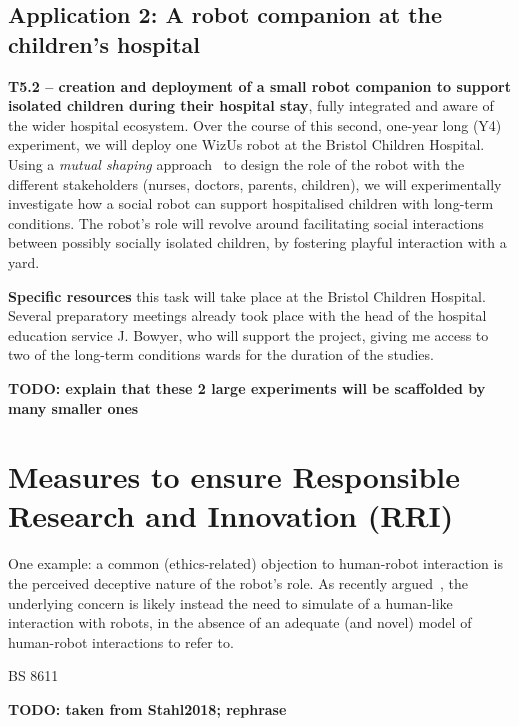 \documentclass[11pt,a4paper]{report}
\newcommand{\project}{WizUs\xspace}
\newcommand{\TODO}[1]{{\color{red}\textbf{TODO: #1}}}
\begin{document}
\subsection{Application 2: A robot companion at the children's hospital}
\textbf{T5.2 -- creation and deployment of a small robot companion to support
isolated children during their hospital stay}, fully integrated and aware of the
wider hospital ecosystem. Over the course of this second, one-year long (Y4)
experiment, we will deploy one \project robot at the Bristol Children Hospital.
Using a \emph{mutual shaping} approach~\cite{winkle2018social} to design the
role of the robot with the different stakeholders (nurses, doctors, parents,
children), we will experimentally investigate how a social robot can support
hospitalised children with long-term conditions. The robot's role will revolve
around facilitating social interactions between possibly socially isolated
children, by fostering playful interaction with a yard.

\textbf{Specific resources} this task will take place at the Bristol Children
Hospital. Several preparatory meetings already took place with the head of the
hospital education service J. Bowyer, who will support the project, giving me
access to two of the long-term conditions wards for the duration of the studies.



\TODO{explain that these 2 large experiments will be scaffolded by many smaller
ones}


\section{Measures to ensure Responsible Research and Innovation (RRI)}



One example: a common (ethics-related) objection to human-robot interaction is
the perceived deceptive nature of the robot's role. As recently
argued~\cite{biscontilucidi2018companion}, the underlying concern is likely
instead the need to simulate of a human-like interaction with robots, in the
absence of an adequate (and novel) model of human-robot interactions to refer
to.


BS 8611~\cite{bsi2016robots}
~\cite{stahl2018implementing}


\TODO{taken from Stahl2018; rephrase}
\end{document}
